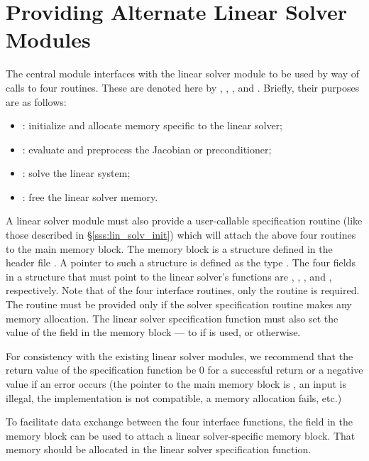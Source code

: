 \chapter{Providing Alternate Linear Solver Modules}\label{s:new_linsolv}
The central {\cvode} module interfaces with the linear solver module to be
used by way of calls to four routines.  These are denoted here by 
, , , and .
Briefly, their purposes are as follows:
\begin{itemize}
\item {}: initialize and allocate memory specific to the
  linear solver;
\item {}: evaluate and preprocess the Jacobian or preconditioner;
\item {}: solve the linear system;
\item {}: free the linear solver memory.
\end{itemize}
A linear solver module must also provide a user-callable specification
routine (like those described in \S\ref{sss:lin_solv_init}) which will
attach the above four routines to the main {\cvode} memory block.
The {\cvode} memory block is a structure defined in the header file
.  A pointer to such a structure is defined as the
type .  The four fields in a  structure that
must point to the linear solver's functions are ,
, , and , respectively.
Note that of the four interface routines, only the  routine
is required.  The  routine must be provided only if the solver
specification routine makes any memory allocation.
The linear solver specification function must also set the value of
the field  in the {\cvode} memory block --- to
 if  is used, or  otherwise.

For consistency with the existing {\cvode} linear solver modules, we
recommend that the return value of the specification function be 0 for
a successful return or a negative value if an error occurs (the
pointer to the main {\cvode} memory block is , an input is
illegal, the {\nvector} implementation is not compatible, a memory
allocation fails, etc.)

To facilitate data exchange between the four interface functions, the
field  in the {\cvode} memory block can be used to attach
a linear solver-specific memory block.
That memory should be allocated in the linear solver specification function.

